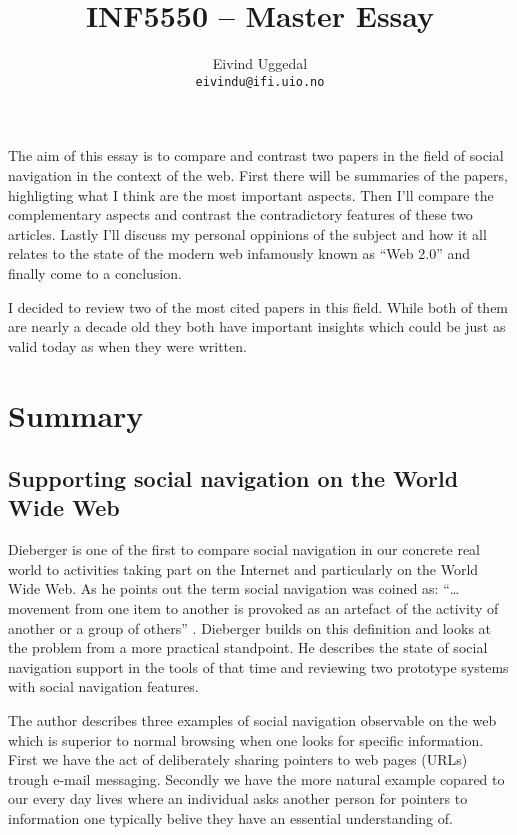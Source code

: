 \documentclass[12pt,a4paper]{article}
\author{Eivind Uggedal\\
  \texttt{eivindu@ifi.uio.no}}
\title{INF5550 -- Master Essay}
\begin{document}
\maketitle{}

The aim of this essay is to compare and contrast two papers in the field of
social navigation in the context of the web. First there will be summaries
of the papers, highligting what I think are the most important aspects.
Then I'll compare the complementary aspects and contrast the contradictory
features of these two articles. Lastly I'll discuss my personal
oppinions of the subject and how it all relates to the state of the modern web
infamously known as ``Web 2.0'' and finally come to a conclusion.

I decided to review two of the most cited papers in this field. While both of
them are nearly a decade old they both have important insights which could be
just as valid today as when they were written.

\cite{wexelblat99}
\cite{dieberger97}

\section{Summary}

\subsection{Supporting social navigation on the World Wide Web}

Dieberger is one of the first to compare social navigation in our concrete
real world to activities taking part on the Internet and particularly on the
World Wide Web. As he points out the term social navigation was coined as:
``\ldots movement from one item to another is provoked as an artefact of the
activity of another or a group of others'' \cite{dourish94}. Dieberger builds
on this definition and looks at the problem from a more practical standpoint.
He describes the state of social navigation support in the tools of that time
and reviewing two prototype systems with social navigation features.

The author describes three examples of social navigation observable on the web
which is superior to
normal browsing when one looks for specific information. First we have the
act of deliberately sharing pointers to web pages (URLs) trough e-mail
messaging. Secondly we have the more natural example copared to our every day
lives where an individual asks another person for pointers to information one
typically belive they have an essential understanding of.
\end{document}
